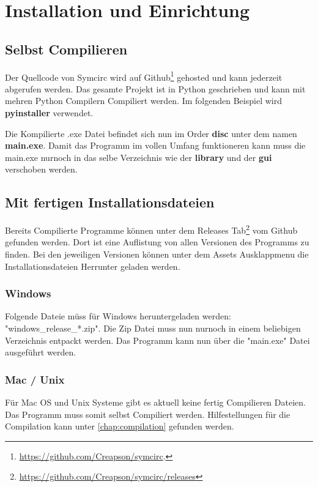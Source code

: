\section{Installation und Einrichtung}
\subsection{Selbst Compilieren}
\label{chap:compilation}
Der Quellcode von Symcirc wird auf Github\footnote{\url{https://github.com/Creapson/symcirc}.} gehosted und kann jederzeit abgerufen werden. Das gesamte Projekt ist in Python geschrieben und kann mit mehren Python Compilern Compiliert werden. Im folgenden Beispiel wird \textbf{pyinstaller} verwendet.



Die Kompilierte .exe Datei befindet sich nun im Order \textbf{disc} unter dem namen \textbf{main.exe}. Damit das Programm im vollen Umfang funktioneren kann muss die main.exe nurnoch in das selbe Verzeichnis wie der \textbf{library} und der \textbf{gui} verschoben werden.

\subsection{Mit fertigen Installationsdateien}
Bereits Compilierte Programme können unter dem Releases Tab\footnote{\url{https://github.com/Creapson/symcirc/releases}} vom Github gefunden werden. Dort ist eine Auflistung von allen Versionen des Programms zu finden. Bei den jeweiligen Versionen können unter dem Assets Ausklappmenu die Installationsdateien Herrunter geladen werden.
\subsubsection{Windows}
Folgende Dateie müss für Windows heruntergeladen werden: "windows\_release\_*.zip". Die Zip Datei muss nun nurnoch in einem beliebigen Verzeichnis entpackt werden. Das Programm kann nun über die "main.exe" Datei ausgeführt werden.

\subsubsection{Mac / Unix}
Für Mac OS und Unix Systeme gibt es aktuell keine fertig Compilieren Dateien. Das Programm muss somit selbst Compiliert werden. Hilfestellungen für die Compilation kann unter \autoref{chap:compilation} gefunden werden.